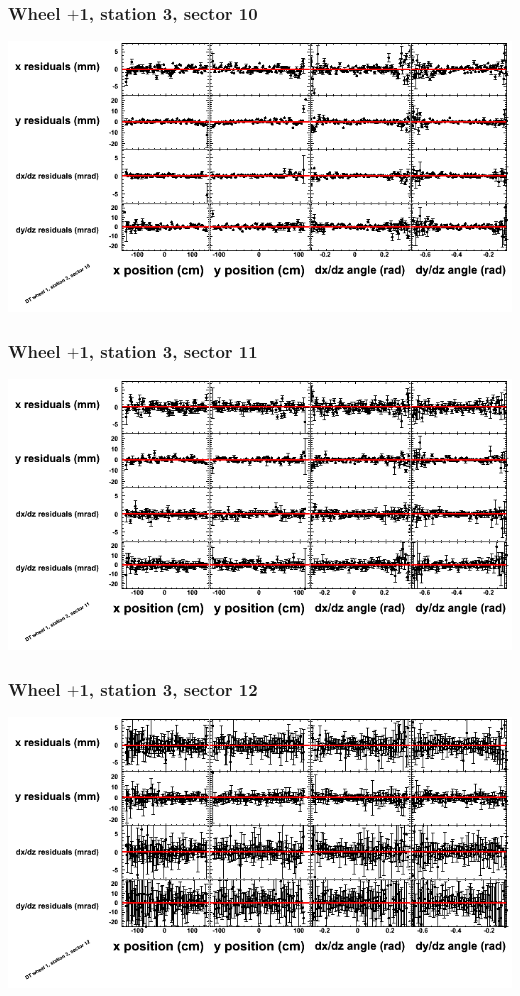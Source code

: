 \documentclass[compress]{beamer}
\begin{document}
\begin{frame}
\frametitle{Wheel $+$1, station 3, sector 10}
\includegraphics[width=\linewidth]{tmppoly_MBwhDst3sec10.png}
\end{frame}

\begin{frame}
\frametitle{Wheel $+$1, station 3, sector 11}
\includegraphics[width=\linewidth]{tmppoly_MBwhDst3sec11.png}
\end{frame}

\begin{frame}
\frametitle{Wheel $+$1, station 3, sector 12}
\includegraphics[width=\linewidth]{tmppoly_MBwhDst3sec12.png}
\end{frame}
\end{document}
